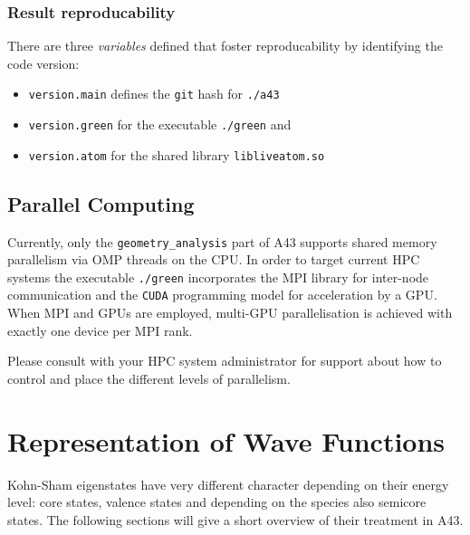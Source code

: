\documentclass[oribibl]{llncs}
\newcommand{\ttt}[1]{\texttt{#1}}
\newcommand{\codename}{A43}
\begin{document}
\subsubsection{Result reproducability} \label{sec:reproducability}
%
There are three \emph{variables} defined that foster reproducability by identifying the code version:
\begin{itemize}
    \item \ttt{version.main} defines the \ttt{git} hash for \ttt{./a43}
    \item \ttt{version.green} for the executable \ttt{./green} and
    \item \ttt{version.atom} for the shared library \ttt{libliveatom.so}     
\end{itemize}


\subsection{Parallel Computing} \label{sec:parallelization}
%
Currently, only the \ttt{geometry\_analysis} part of \codename{} supports shared memory parallelism 
via \ac{OMP} threads on the \ac{CPU}.
In order to target current \ac{HPC} systems 
the executable \ttt{./green} incorporates the \ac{MPI} library
for inter-node communication
and the \ttt{CUDA} programming model for acceleration by a \ac{GPU}.
When \ac{MPI} and \ac{GPU}s are employed, multi-\ac{GPU} parallelisation is achieved
with exactly one device per \ac{MPI} rank.

\noindent
Please consult with your \ac{HPC} system administrator for support
about how to control and place the different levels of parallelism.

\section{Representation of Wave Functions} \label{sec:representation}
%
Kohn-Sham eigenstates have very different character depending on their energy level: core states, valence states and depending on the species also semicore states. The following sections will give a short overview of their treatment in \codename{}.
%
%
\end{document}
